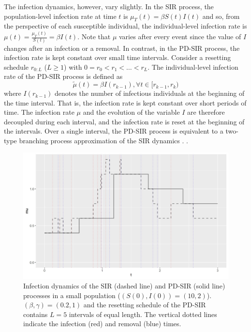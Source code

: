 \documentclass[11pt]{article}
\newcommand{\jx}[1]{{\color{blue}{ #1}}}
\begin{document}
	The infection dynamics, however, vary slightly.
	In the SIR process, the population-level infection rate at time $t$ is $\mu_T(t) = \beta S(t)I(t)$ and so, from the perspective of each susceptible individual, the individual-level infection rate is $\mu(t) = \frac{\mu_T(t)}{S(t)} = \beta I(t)$. Note that $\mu$ varies after every event since the value of $I$ changes after an infection or a removal.
	In contrast, in the PD-SIR process, the infection rate is kept constant over small time intervals. Consider a resetting schedule $r_{0:L}$ ($L\ge1$) with $0 = r_0 < r_1 < \dots < r_L$. The individual-level infection rate of the PD-SIR process is defined as
	$$\tilde{\mu}(t) = \beta I(r_{k - 1}), \forall t \in [r_{k - 1}, r_k)$$
	where $I(r_{k-1})$ denotes the number of infectious individuals at the beginning of the time interval. That is, the infection rate is kept constant over short periods of time. The infection rate $\mu$ and the evolution of the variable $I$ are therefore decoupled during each interval, and the infection rate is reset at the beginning %
	of the intervals. Over a single interval, the PD-SIR process is equivalent to a two-type branching process approximation of the SIR dynamics \cite{Ho.2018}. \jx{I really like how this is written but I wonder if there's some simple figure we can make to illustrate the model and difference between SIR at a glance => line plot of mu over time with colored vertical line for every event. Done.}.
	
	\begin{figure}
		\centering
		\includegraphics[scale = 0.6]{infection_rate_SIR_PDSIR.jpg}
		\caption{Infection dynamics of the SIR (dashed line) and PD-SIR (solid line) processes in a small population ($(S(0), I(0)) = (10,2)$).
			$(\beta, \gamma) = (0.2, 1)$ and the resetting schedule of the PD-SIR contains $L=5$ intervals of equal length.
			The vertical dotted lines indicate the infection (red) and removal (blue) times.}
		\label{fig:mu}
	\end{figure}
	
\end{document}
